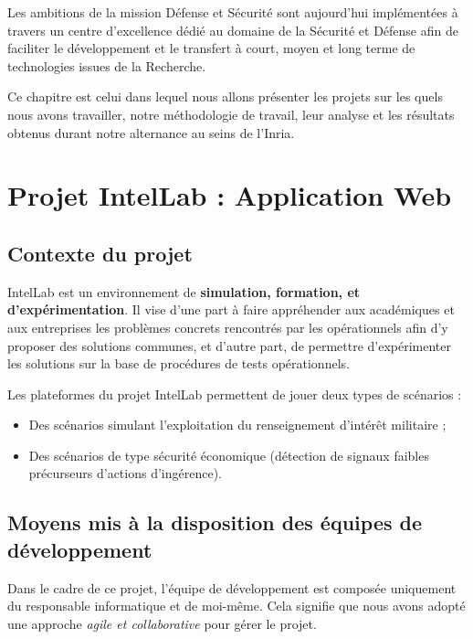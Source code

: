 \sloppy

Les ambitions de la mission Défense et Sécurité sont aujourd’hui implémentées à travers un centre d’excellence dédié au domaine de la Sécurité et Défense afin de faciliter le développement et le transfert à court, moyen et long terme de technologies issues de la Recherche.

Ce chapitre est celui dans lequel nous allons présenter les projets sur les quels nous avons travailler, notre méthodologie de travail, leur analyse et les résultats obtenus durant notre alternance au seins de l'Inria.

\section{Projet IntelLab : Application Web}

\subsection{Contexte du projet}

IntelLab est un environnement de \textbf{simulation, formation, et d’expérimentation}. Il vise d’une part à faire appréhender aux académiques et aux entreprises les problèmes concrets rencontrés par les opérationnels afin d’y proposer des solutions communes, et d’autre part, de permettre d’expérimenter les solutions sur la base de procédures de tests opérationnels.

\noindent Les plateformes du projet IntelLab permettent de jouer deux types de scénarios :

\begin{itemize}\addtolength{\itemsep}{-0.35\baselineskip}%
	\item Des scénarios simulant l'exploitation du renseignement d'intérêt militaire ;
	\item Des scénarios de type sécurité économique (détection de signaux faibles précurseurs d'actions d'ingérence).
\end{itemize}

\subsection{Moyens mis à la disposition des équipes de développement}
Dans le cadre de ce projet, l'équipe de développement est composée uniquement du responsable informatique et de moi-même. Cela signifie que nous avons adopté une approche \textit{agile et collaborative} pour gérer le projet.


